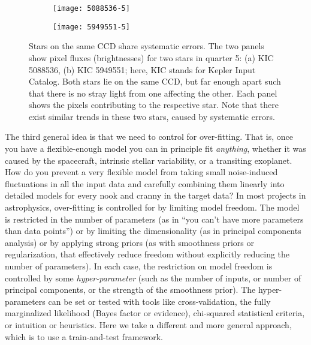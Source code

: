 \documentclass[12pt, preprint]{aastex}
\begin{document}
\begin{figure}[htb]
\centering
\begin{subfigure}[htb]{0.48\columnwidth}
\texttt{[image: 5088536-5]}
\caption{}
\end{subfigure}%
\hfill
\begin{subfigure}[htb]{0.48\columnwidth}
\texttt{[image: 5949551-5]}
\caption{}
\end{subfigure}
\caption{
  \label{ccd} 
  Stars on the same CCD share systematic errors. 
  The two panels show pixel fluxes (brightnesses) for two stars in quarter 5: (a) KIC 5088536, (b) KIC 5949551; 
  here, KIC stands for Kepler Input Catalog. Both stars lie on the same CCD, 
  but far enough apart such that there is no stray light from one affecting the other. 
  Each panel shows the pixels contributing to the respective star.
  Note that there exist similar trends in these two stars, caused by systematic errors. 
}
\end{figure}

The third general idea is that we need to control for over-fitting.
That is, once you have a flexible-enough model you can in principle fit \emph{anything},
  whether it was caused by the spacecraft, intrinsic stellar variability, or a transiting exoplanet.
How do you prevent a very flexible model from taking small noise-induced fluctuations in all the input data
  and carefully combining them linearly into detailed models for every nook and cranny in the target data?
In most projects in astrophysics, over-fitting is controlled for by limiting model freedom.
The model is restricted in the number of parameters
  (as in ``you can't have more parameters than data points'')
  or by limiting the dimensionality
  (as in principal components analysis)
  or by applying strong priors
  (as with smoothness priors or regularization, 
  that effectively reduce freedom without explicitly reducing the number of parameters).
In each case, the restriction on model freedom is controlled by some \emph{hyper-parameter}
  (such as the number of inputs, or number of principal components, or the strength of the smoothness prior).
The hyper-parameters can be set or tested with tools like cross-validation,
  the fully marginalized likelihood (Bayes factor or evidence),
  chi-squared statistical criteria,
  or intuition or heuristics.
Here we take a different and more general approach, which is to use a train-and-test framework.
\end{document}
